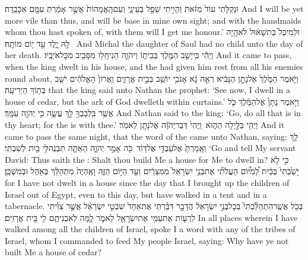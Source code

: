 {וּנְקַלֹּ֤תִי עוֹד֙ מִזֹּ֔את וְהָיִ֥יתִי שָׁפָ֖ל בְּעֵינָ֑י וְעִם\maqqaf הָֽאֲמָהוֹת֙ אֲשֶׁ֣ר אָמַ֔רְתְּ עִמָּ֖ם אִכָּבֵֽדָה׃}
{And I will be yet more vile than thus, and will be base in mine own sight; and with the handmaids whom thou hast spoken of, with them will I get me honour.’}
{וּלְמִיכַל֙ בַּת\maqqaf שָׁא֔וּל לֹא\maqqaf הָ֥יָה לָ֖הּ יָ֑לֶד עַ֖ד י֥וֹם מוֹתָֽהּ׃ \petucha }
{And Michal the daughter of Saul had no child unto the day of her death.}
\newperek
{}
{וַיְהִ֕י כִּֽי\maqqaf יָשַׁ֥ב הַמֶּ֖לֶךְ בְּבֵית֑וֹ וַיהֹוָ֛ה הֵנִיחַֽ\maqqaf ל֥וֹ מִסָּבִ֖יב מִכׇּל\maqqaf אֹיְבָֽיו׃}
{And it came to pass, when the king dwelt in his house, and the \lord\space had given him rest from all his enemies round about,}
{וַיֹּ֤אמֶר הַמֶּ֙לֶךְ֙ אֶל\maqqaf נָתָ֣ן הַנָּבִ֔יא רְאֵ֣ה נָ֔א אָנֹכִ֥י יוֹשֵׁ֖ב בְּבֵ֣ית אֲרָזִ֑ים וַֽאֲרוֹן֙ הָאֱלֹהִ֔ים יֹשֵׁ֖ב בְּת֥וֹךְ הַיְרִיעָֽה׃}
{that the king said unto Nathan the prophet: ‘See now, I dwell in a house of cedar, but the ark of God dwelleth within curtains.’}
{וַיֹּ֤אמֶר נָתָן֙ אֶל\maqqaf הַמֶּ֔לֶךְ כֹּ֛ל אֲשֶׁ֥ר בִּֽלְבָבְךָ֖ לֵ֣ךְ עֲשֵׂ֑ה כִּ֥י יְהֹוָ֖ה עִמָּֽךְ׃}
{And Nathan said to the king: ‘Go, do all that is in thy heart; for the \lord\space is with thee.’}
{וַיְהִ֖י בַּלַּ֣יְלָה הַה֑וּא \setuma  וַֽיְהִי֙ דְּבַר\maqqaf יְהֹוָ֔ה אֶל\maqqaf נָתָ֖ן לֵאמֹֽר׃}
{And it came to pass the same night, that the word of the \lord\space came unto Nathan, saying:}
{לֵ֤ךְ וְאָֽמַרְתָּ֙ אֶל\maqqaf עַבְדִּ֣י אֶל\maqqaf דָּוִ֔ד \setuma  כֹּ֖ה אָמַ֣ר יְהֹוָ֑ה הַאַתָּ֛ה תִּבְנֶה\maqqaf לִּ֥י בַ֖יִת לְשִׁבְתִּֽי׃}
{‘Go and tell My servant David: Thus saith the \lord: Shalt thou build Me a house for Me to dwell in?}
{כִּ֣י לֹ֤א יָשַׁ֙בְתִּי֙ בְּבַ֔יִת לְ֠מִיּ֠וֹם הַעֲלֹתִ֞י אֶת\maqqaf בְּנֵ֤י יִשְׂרָאֵל֙ מִמִּצְרַ֔יִם וְעַ֖ד הַיּ֣וֹם הַזֶּ֑ה וָאֶֽהְיֶה֙ מִתְהַלֵּ֔ךְ בְּאֹ֖הֶל וּבְמִשְׁכָּֽן׃}
{for I have not dwelt in a house since the day that I brought up the children of Israel out of Egypt, even to this day, but have walked in a tent and in a tabernacle.}
{בְּכֹ֥ל אֲשֶֽׁר\maqqaf הִתְהַלַּ֘כְתִּי֮ בְּכׇל\maqqaf בְּנֵ֣י יִשְׂרָאֵל֒ הֲדָבָ֣ר דִּבַּ֗רְתִּי אֶת\maqqaf אַחַד֙ שִׁבְטֵ֣י יִשְׂרָאֵ֔ל אֲשֶׁ֣ר צִוִּ֗יתִי לִרְע֛וֹת אֶת\maqqaf עַמִּ֥י אֶת\maqqaf יִשְׂרָאֵ֖ל לֵאמֹ֑ר לָ֛מָּה לֹֽא\maqqaf בְנִיתֶ֥ם לִ֖י בֵּ֥ית אֲרָזִֽים׃}
{In all places wherein I have walked among all the children of Israel, spoke I a word with any of the tribes of Israel, whom I commanded to feed My people Israel, saying: Why have ye not built Me a house of cedar?}
